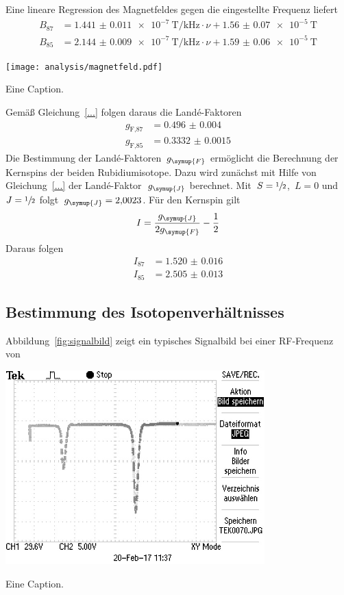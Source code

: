 %
Eine lineare Regression des Magnetfeldes gegen die eingestellte Frequenz liefert
%
\begin{align}
  B_{87}&=\SI{1.441(11)e-7}{\tesla\per\kilo\hertz}\cdot\nu+\SI{1.56(7)e-5}{\tesla} \\
  B_{85}&=\SI{2.144(9)e-7}{\tesla\per\kilo\hertz}\cdot\nu+\SI{1.59(6)e-5}{\tesla}
\end{align}
%
\begin{table}[htb]
  \centering
  \texttt{[image: analysis/magnetfeld.pdf]}
  \caption{Eine Caption.}
  \label{fig:magnetfeld}
\end{table}
%
Gemäß Gleichung~\eqref{...} folgen daraus die Landé-Faktoren
%
\begin{align}
  g_{\text{F,87}}&=\num{0.496(4)} \\
  g_{\text{F,85}}&=\num{0.3332(15)}
\end{align}
%
Die Bestimmung der Landé-Faktoren~$g_{\symup{F}}$ ermöglicht die Berechnung der
Kernspins der beiden Rubidiumisotope. Dazu wird zunächst mit Hilfe von
Gleichung~\eqref{...} der Landé-Faktor~$g_{\symup{J}}$ berechnet.
Mit~$S=\sfrac{1}{2}$,~$L=0$ und~$J=\sfrac{1}{2}$
folgt~$g_{\symup{J}}=\num{2.0023}$. Für den Kernspin gilt
%
\begin{equation*}
  I=\frac{g_{\symup{J}}}{2g_{\symup{F}}}-\frac{1}{2}
\end{equation*}
%
Daraus folgen
%
\begin{align}
  I_{87}&=\num{1.520(16)} \\
  I_{85}&=\num{2.505(13)}
\end{align}

\subsection{Bestimmung des Isotopenverhältnisses}
Abbildung~\ref{fig:signalbild} zeigt ein typisches Signalbild bei einer
RF-Frequenz von
%
\begin{table}[htb]
  \centering
  \includegraphics[width=0.75\textwidth]{analysis/signalbild.png}
  \caption{Eine Caption.}
  \label{fig:signalbild}
\end{table}
%
